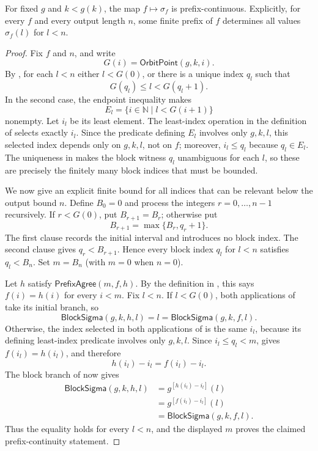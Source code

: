 \begin{lemma}
For fixed $g$ and $k<g(k)$, the map $f\mapsto\sigma_f$ is
prefix-continuous.  Explicitly, for every $f$ and every output length $n$,
some finite prefix of $f$ determines all values
$\sigma_f(l)$ for $l<n$.
\end{lemma}
\begin{proof}
Fix $f$ and $n$, and write
\[
G(i)=\mathsf{OrbitPoint}(g,k,i).
\]
By , for each $l<n$ either $l<G(0)$, or there
is a unique index $q_l$ such that
\[
G(q_l)\leq l<G(q_l+1).
\]
In the second case, the endpoint inequality makes
\[
E_l=\{i\in\mathbb N\mid l<G(i+1)\}
\]
nonempty.  Let $i_l$ be its least element.  The least-index operation in
the definition of  selects exactly $i_l$.  Since the
predicate defining $E_l$ involves only $g,k,l$, this selected index depends
only on $g,k,l$, not on $f$; moreover, $i_l\leq q_l$ because $q_l\in E_l$.
The uniqueness in  makes the block witness
$q_l$ unambiguous for each $l$, so these are precisely the finitely many
block indices that must be bounded.

We now give an explicit finite bound for all indices that can be relevant
below the output bound $n$.  Define $B_0=0$ and process the integers
$r=0,\ldots,n-1$ recursively.  If $r<G(0)$, put $B_{r+1}=B_r$; otherwise
put
\[
B_{r+1}=\max\{B_r,q_r+1\}.
\]
The first clause records the initial interval and introduces no block index.
The second clause gives $q_r<B_{r+1}$.  Hence every block index $q_l$ for
$l<n$ satisfies $q_l<B_n$.  Set $m=B_n$ (with $m=0$ when $n=0$).

Let $h$ satisfy \(\mathsf{PrefixAgree}(m,f,h)\).  By the definition in
, this says $f(i)=h(i)$ for every $i<m$.  Fix $l<n$.
If $l<G(0)$, both applications of  take its initial
branch, so
\[
\mathsf{BlockSigma}(g,k,h,l)=l=\mathsf{BlockSigma}(g,k,f,l).
\]
Otherwise, the index selected in both applications of 
is the same $i_l$, because its defining least-index predicate involves only
$g,k,l$.  Since $i_l\leq q_l<m$,  gives
$f(i_l)=h(i_l)$, and therefore
\[
h(i_l)-i_l=f(i_l)-i_l.
\]
The block branch of  now gives
\[
\begin{aligned}
\mathsf{BlockSigma}(g,k,h,l)
  &=g^{[h(i_l)-i_l]}(l)\\
  &=g^{[f(i_l)-i_l]}(l)\\
  &=\mathsf{BlockSigma}(g,k,f,l).
\end{aligned}
\]
Thus the equality holds for every $l<n$, and the displayed $m$ proves the
claimed prefix-continuity statement.
\end{proof}
